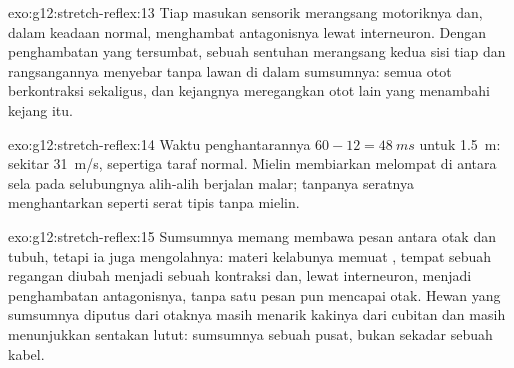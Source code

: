 \begin{solution}{exo:g12:stretch-reflex:13}
Tiap masukan sensorik merangsang  motoriknya dan, dalam keadaan
normal, menghambat  antagonisnya lewat interneuron. Dengan
penghambatan yang tersumbat, sebuah sentuhan merangsang kedua sisi
tiap  dan rangsangannya menyebar tanpa lawan di dalam sumsumnya:
semua otot berkontraksi sekaligus, dan kejangnya meregangkan otot lain
yang  menambahi kejang itu.
\end{solution}

\begin{solution}{exo:g12:stretch-reflex:14}
Waktu penghantarannya $60 - 12 = \qty{48}{ms}$ untuk \qty{1.5}{m}:
sekitar \qty{31}{m/s}, sepertiga taraf normal. Mielin membiarkan
 melompat di antara sela pada selubungnya alih-alih
berjalan malar; tanpanya seratnya menghantarkan seperti serat tipis
tanpa mielin.
\end{solution}

\begin{solution}{exo:g12:stretch-reflex:15}
Sumsumnya memang membawa pesan antara otak dan tubuh, tetapi ia juga
mengolahnya: materi kelabunya memuat  ,
tempat sebuah regangan diubah menjadi sebuah kontraksi dan, lewat
interneuron, menjadi penghambatan antagonisnya, tanpa satu pesan pun
mencapai otak. Hewan yang sumsumnya diputus dari otaknya masih menarik
kakinya dari cubitan dan masih menunjukkan sentakan lutut: sumsumnya
sebuah pusat, bukan sekadar sebuah kabel.
\end{solution}

